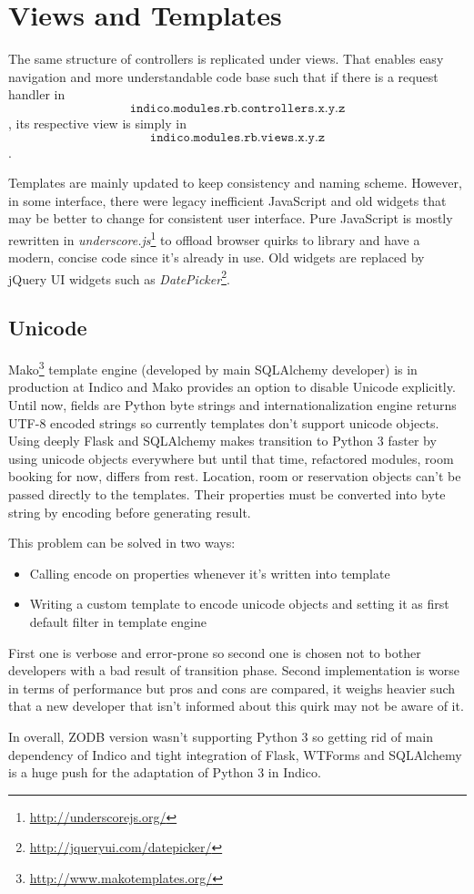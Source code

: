 \section{Views and Templates}

The same structure of controllers is replicated under views. That enables easy navigation and more understandable code base such that if there is a request handler in $$\texttt{indico.modules.rb.controllers.x.y.z}$$, its respective view is simply in $$\texttt{indico.modules.rb.views.x.y.z}$$.

Templates are mainly updated to keep consistency and naming scheme. However, in some interface, there were legacy inefficient JavaScript and old widgets that may be better to change for consistent user interface. Pure JavaScript is mostly rewritten in \textit{underscore.js}\footnote{\url{http://underscorejs.org/}} to offload browser quirks to library and have a modern, concise code since it's already in use. Old widgets are replaced by jQuery UI widgets such as \textit{DatePicker}\footnote{\url{http://jqueryui.com/datepicker/}}.

\subsection{Unicode}

Mako\footnote{\url{http://www.makotemplates.org/}} template engine (developed by main SQLAlchemy developer) is in production at Indico and Mako provides an option to disable Unicode explicitly. Until now, fields are Python byte strings and internationalization engine returns UTF-8 encoded strings so currently templates don't support unicode objects. Using deeply Flask and SQLAlchemy makes transition to Python 3 faster by using unicode objects everywhere but until that time, refactored modules, room booking for now, differs from rest. Location, room or reservation objects can't be passed directly to the templates. Their properties must be converted into byte string by encoding before generating result.

This problem can be solved in two ways:
\begin{itemize}
  \item Calling encode on properties whenever it's written into template
  \item Writing a custom template to encode unicode objects and setting it as first default filter in template engine
\end{itemize}

First one is verbose and error-prone so second one is chosen not to bother developers with a bad result of transition phase. Second implementation is worse in terms of performance but pros and cons are compared, it weighs heavier such that a new developer that isn't informed about this quirk may not be aware of it.

In overall, ZODB version wasn't supporting Python 3 so getting rid of main dependency of Indico and tight integration of Flask, WTForms and SQLAlchemy is a huge push for the adaptation of Python 3 in Indico.